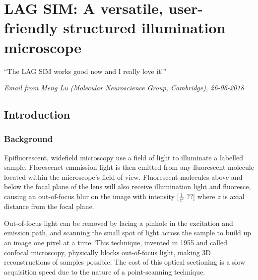 \chapter{LAG SIM: A versatile, user-friendly structured illumination microscope} \label{chap:LAGSIM}



\ifpdf
    \graphicspath{{Chapter2/Figs/Raster/}{Chapter2/Figs/PDF/}{Chapter2/Figs/}}
\else
    \graphicspath{{Chapter2/Figs/Vector/}{Chapter2/Figs/}}
\fi

``The LAG SIM works good now and I really love it!''

\textit{Email from Meng Lu (Molecular Neuroscience Group, Cambridge), 26-06-2018}

\section{Introduction} \label{sec:simintro}
\subsection{Background}
Epifluorescent, widefield microscopy use a field of light to illuminate a labelled sample. 
Floresecnet emmission light is then emitted from any fluorescent molecule located within the microscope's field of view. 
Fluorescent molecules above and below the focal plane of the lens will also receive illumination light and fluoresce, causing an out-of-focus blur on the image with intensity [$\frac{1}{z^2}$ ??] where $z$ is axial distance from the focal plane. 

Out-of-focus light can be removed by lacing a pinhole in the excitation and emission path, and scanning the small spot of light across the sample to build up an image one pixel at a time. 
This technique, invented in 1955 and called confocal microscopy, physically blocks out-of-focus light, making 3D reconstructions of samples possible. 
The cost of this optical sectioning is a slow acquisition speed due to the nature of a point-scanning technique. 


